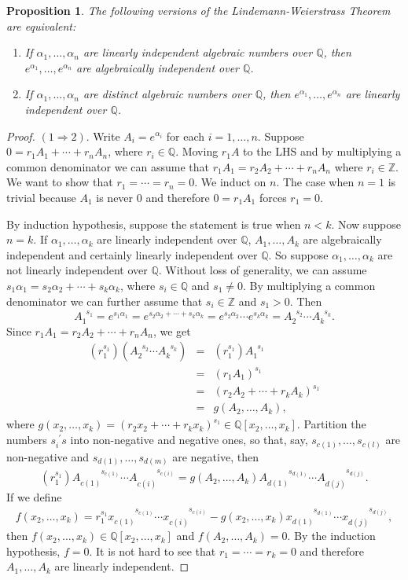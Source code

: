 \documentclass[12pt]{article}
\newtheorem{prop}{Proposition}
\newcommand{\rats}{\mathbb{Q}}
\newcommand{\ints}{\mathbb{Z}}
\newcommand{\pwr}[3]{{#1}_{#2}^{\phantom{#2}#3}}
\begin{document}
\begin{prop} The following versions of the
Lindemann-Weierstrass Theorem are equivalent:
\begin{enumerate}
\item
If $\alpha_1, \ldots, \alpha_n$ are linearly independent algebraic numbers over $\rats$, then
$e^{\alpha_1}, \ldots, e^{\alpha_n}$ are algebraically independent over $\rats$.
\item
If $\alpha_1, \ldots, \alpha_n$ are distinct algebraic numbers over $\rats$, then
$e^{\alpha_1}, \ldots, e^{\alpha_n}$ are linearly independent over $\rats$.
\end{enumerate}
\end{prop}
\begin{proof}

$(1 \Longrightarrow 2).$  Write $A_i=e^{\alpha_i}$ for each $i=1,\dots,n$.  Suppose $0=r_1A_1+\cdots+r_nA_n$,
where $r_i\in\rats$.  Moving $r_1A$ to the LHS and by multiplying a common denominator we can assume that $r_1A_1=
r_2A_2+\cdots+r_nA_n$ where $r_i\in\ints$.  We want to show that $r_1=\cdots=r_n=0$.  We induct on $n$.  The case when
$n=1$ is trivial because $A_1$ is never 0 and therefore $0=r_1A_1$ forces $r_1=0$.  

By induction hypothesis, suppose the statement is true when $n<k$.  Now suppose $n=k$.  If $\alpha_1,
\ldots,\alpha_k$ are linearly independent over $\rats$, $A_1,\ldots,A_k$ are algebraically independent and certainly
linearly independent over $\rats$.  So suppose $\alpha_1,\ldots,\alpha_k$ are not linearly independent over $\rats$.
Without loss of generality, we can assume $s_1\alpha_1=s_2\alpha_2+\cdots+s_k\alpha_k$, where $s_i\in\rats$ and $s_1
\neq0$.  By multiplying a common denominator we can further assume that $s_i\in\ints$ and $s_1>0$.  Then
$$\pwr{A}{1}{s_1}=e^{s_1\alpha_1}=e^{s_2\alpha_2+\cdots+s_k\alpha_k}=e^{s_2\alpha_2}\cdots e^{s_k\alpha_k}=
\pwr{A}{2}{s_2}\cdots\pwr{A}{k}{s_k}.$$  Since $r_1A_1=r_2A_2+\cdots+r_nA_n$, we get
\begin{eqnarray*}
(r_1^{s_1})(\pwr{A}{2}{s_2}\cdots\pwr{A}{k}{s_k}) &=& (r_1^{s_1})\pwr{A}{1}{s_1} \\ &=& (r_1A_1)^{s_1} \\
&=& (r_2A_2+\cdots+r_kA_k)^{s_1} \\ &=& g(A_2,\ldots,A_k),
\end{eqnarray*}
where $g(x_2,\ldots,x_k)=(r_2x_2+\cdots+r_kx_k)^{s_1}\in\rats[x_2,\ldots,x_k].$  Partition the numbers $\pwr{s}{i}{'}s$ into non-negative and negative ones, so that, say, 
$s_{c(1)},\ldots,s_{c(l)}$ are non-negative and $s_{d(1)},\ldots,s_{d(m)}$ are negative, then
$$(r_1^{s_1})\pwr{A}{c(1)}{s_{c(1)}}\cdots\pwr{A}{c(i)}{s_{c(i)}}=g(A_2,\ldots,A_k)
\pwr{A}{d(1)}{s_{d(1)}}\cdots\pwr{A}{d(j)}{s_{d(j)}}.$$
If we define $$f(x_2,\ldots,x_k)=r_1^{s_1}\pwr{x}{c(1)}{s_{c(1)}}\cdots\pwr{x}{c(i)}{s_{c(i)}}-g(x_2,\ldots,x_k)
\pwr{x}{d(1)}{s_{d(1)}}\cdots\pwr{x}{d(j)}{s_{d(j)}},$$  then $f(x_2,\ldots,x_k)\in\rats[x_2,\ldots,x_k]$ and
$f(A_2,\ldots,A_k)=0.$  By the induction hypothesis, $f=0$.  It is not hard to see that $r_1=\cdots=r_k=0$ and
therefore $A_1,\ldots,A_k$ are linearly independent.


\end{proof}
\end{document}
